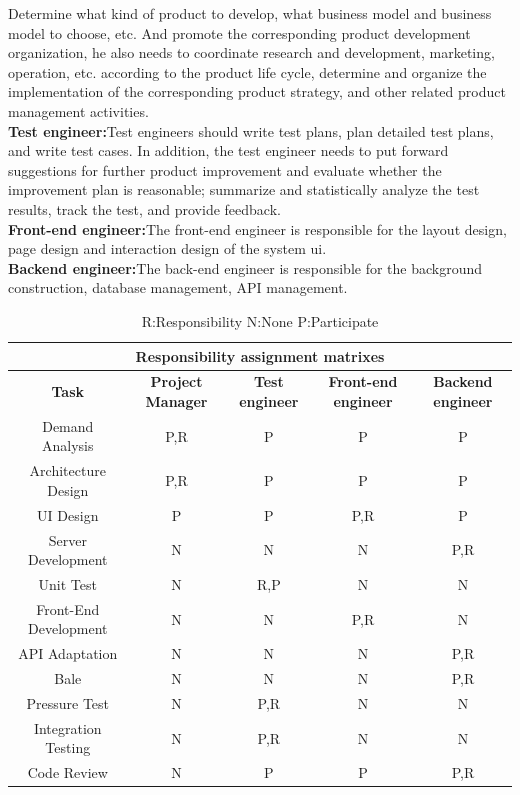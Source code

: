 \documentclass[runningheads]{llncs}
\begin{document}
Determine what kind of product to develop, what business model and business model to choose, etc. And promote the corresponding product development organization, he also needs to coordinate research and development, marketing, operation, etc. according to the product life cycle, determine and organize the implementation of the corresponding product strategy, and other related product management activities.\\
\textbf{Test engineer:}Test engineers should write test plans, plan detailed test plans, and write test cases. In addition, the test engineer needs to put forward suggestions for further product improvement and evaluate whether the improvement plan is reasonable; summarize and statistically analyze the test results, track the test, and provide feedback.\\
\textbf{Front-end engineer:}The front-end engineer is responsible for the layout design, page design and interaction design of the system ui.\\
\textbf{Backend engineer:}The back-end engineer is responsible for the background construction, database management, API management.
\begin{table}
\centering
\begin{tabular}{|c|c|c|c|c|}
\hline
\multicolumn{5}{|c|}{\textbf{Responsibility assignment matrixes}}\\ %
\hline
\textbf{Task}&\textbf{Project Manager}&\textbf{Test engineer}&\textbf{Front-end engineer}&\textbf{Backend engineer}\\
\hline
Demand Analysis&P,R&P&P&P\\
\hline
Architecture Design&P,R&P&P&P\\
\hline
UI Design&P&P&P,R&P\\
\hline
Server Development&N&N&N&P,R\\
\hline
Unit Test&N&R,P&N&N\\
\hline
Front-End Development&N&N&P,R&N\\
\hline
API Adaptation&N&N&N&P,R\\
\hline
Bale&N&N&N&P,R\\
\hline
Pressure Test&N&P,R&N&N\\
\hline
Integration Testing&N&P,R&N&N\\
\hline
Code Review&N&P&P&P,R\\
\hline

\end{tabular}
\caption{R:Responsibility  N:None  P:Participate}
\end{table}
\end{document}
